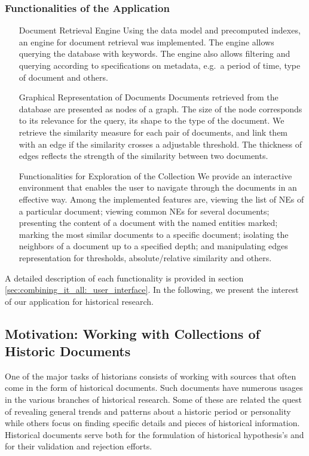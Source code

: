 \subsubsection{Functionalities of the Application}
\begin{enumerate}
\item[Document Retrieval Engine] Using the data model and precomputed indexes, an engine for document retrieval was implemented. 
The engine allows querying the database with keywords. The engine also allows filtering and querying according to specifications on metadata, e.g.\ a period of time, type of document and others. 
\item[Graphical Representation of Documents] Documents retrieved from the database are presented as nodes of a graph. The size of the node corresponds to its relevance for the query, its shape to the type of the document. We retrieve the similarity measure for each pair of documents, and link them with an edge if the similarity crosses a adjustable threshold. The thickness of edges reflects the strength of the similarity between two documents.
\item[Functionalities for Exploration of the Collection] We provide an interactive environment that enables the user to navigate through the documents in an effective way. Among the implemented features are, viewing the list of NEs of a particular document; viewing common NEs for several documents; presenting the content of a document with the named entities marked; marking the most similar documents to a specific document; isolating the neighbors of a document up to a specified depth; and manipulating edges representation for thresholds, absolute/relative similarity and others.
\end{enumerate}

A detailed description of each functionality is provided in section \ref{sec:combining_it_all:_user_interface}. In the following, we present the interest of our application for historical research. 

\subsection{Motivation: Working with Collections of Historic Documents}
\label{sec:motivation}
One of the major tasks of historians consists of working with sources that often come in the form of historical documents. 
Such documents have numerous usages in the various branches of historical research. Some of these are related the quest of revealing 
general trends and patterns about a historic period or personality while others focus on finding specific details and pieces of historical 
information. Historical documents serve both for the formulation of historical hypothesis's and for their validation and rejection efforts. 


